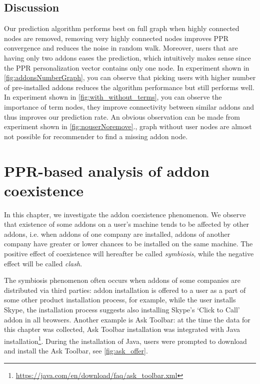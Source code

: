 \documentclass[11pt,oneside]{book}
\let\Oldsection\section
\renewcommand{\section}{\FloatBarrier\Oldsection}
\begin{document}
\section{Discussion}
Our prediction algorithm performs best on full graph when highly
connected nodes are removed, removing very highly connected nodes
improves PPR convergence and reduces the noise in random walk.
Moreover, users that are having only two addons eases the prediction,
which intuitively makes sense since the PPR personalization vector
contains only one node. In experiment shown in
\autoref{fig:addonsNumberGraph}, you can observe that picking users
with higher number of pre-installed addons reduces the algorithm
performance but still performs well. In experiment shown in
\autoref{fig:with_without_terms}, you can observe the importance of
term nodes, they improve connectivity between similar addons and thus
improves our prediction rate. An obvious observation can be made from
experiment shown in \autoref{fig:nouserNoremove}., graph without user
nodes are almost not possible for recommender to find a missing addon
node.


\chapter{PPR-based analysis of addon coexistence}
\label{chap:Symbiosis}

In this chapter, we investigate the addon coexistence phenomenon. We observe that existence of some addons on a user's machine tends to be affected by other addons, i.e. when addons of one company are installed, addons of another company have greater or lower chances to be installed on the same machine. The positive effect of coexistence will hereafter be called \emph{symbiosis}, while the negative effect will be called \emph{clash}.

The symbiosis phenomenon often occurs when addons of some companies are distributed via third parties: addon installation is offered to a user as a part of some other product installation process, for example, while the user installs Skype, the installation process suggests also installing Skype's `Click to Call' addon in all browsers. Another example is Ask Toolbar: at the time the data for this chapter was collected, Ask Toolbar installation was integrated with Java installation\footnote{\url{https://java.com/en/download/faq/ask_toolbar.xml}}. During the installation of Java, users were prompted to download and install the Ask Toolbar, see \autoref{fig:ask_offer}. 
\end{document}
